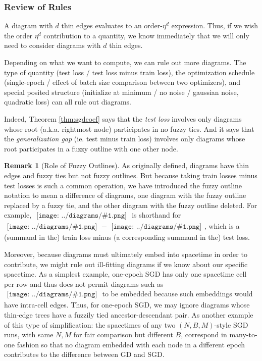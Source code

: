 \documentclass{article}
\theoremstyle{plain}
\theoremstyle{definition}
\newtheorem*{rmk*}{Remark}
\newcommand{\sdia}[1]{\begin{gathered}\texttt{[image: ../diagrams/\#1.png]}\end{gathered}}
\begin{document}
        \subsubsection*{Review of Rules}
            A diagram with $d$ thin edges evaluates to an order-$\eta^d$
            expression.  Thus, if we wish the order $\eta^d$ contribution to a
            quantity, we know immediately that we will only need to consider
            diagrams with $d$ thin edges.

            Depending on what we want to compute, we can rule out more
            diagrams.  The type of quantity (test loss / test loss minus train
            loss), the
            optimization schedule (single-epoch / effect of batch size comparison
            between two optimizers), and special posited
            structure (initialize at minimum / no noise / gaussian noise,
            quadratic loss) can all rule out diagrams.

            Indeed, Theorem \ref{thm:sgdcoef} says that the \emph{test loss}
            involves only diagrams whose root (a.k.a. rightmost node)
            participates in no fuzzy ties.  And it says that the
            \emph{generalization gap} (ie. test minus train loss) involves only
            diagrams whose root participates in a fuzzy outline with one other
            node.
            \begin{rmk*}[Role of Fuzzy Outlines]
                As originally defined, diagrams have thin edges and fuzzy ties
                but not fuzzy outlines.  But because taking train losses minus
                test losses is such a common operation, we have introduced the
                fuzzy outline notation to mean a difference of diagrams, one
                diagram with the fuzzy outline replaced by a fuzzy tie, and the
                other diagram with the fuzzy outline deleted.  For example,
                $\sdia{c(0-12)(01-12)}$ is shorthand for $\sdia{(0-12)(01-12)}
                - \sdia{(0-1-2)(01-12)}$, which is a (summand in the) train
                loss minus (a corresponding summand in the) test loss.    
            \end{rmk*}

            Moreover, because diagrams must ultimately embed into spacetime in
            order to contribute, we might rule out ill-fitting diagrams if
            we know about our specific spacetime.  As a simplest example, 
            one-epoch SGD has only one spacetime cell per row and thus does
            not permit diagrams such as $\sdia{(01-2)(01-12)}$ to be embedded
            because such embeddings would have intra-cell edges.  Thus, for
            one-epoch SGD, we may ignore diagrams whose thin-edge trees have
            a fuzzily tied ancestor-descendant pair.
            As another example of this type of simplification: the spacetimes
            of any two $(N,B,M)$-style SGD runs, with same $N, M$ for fair
            comparison but different $B$, correspond in many-to-one fashion so
            that no diagram embedded with each node in a different epoch
            contributes to the difference between GD and SGD.
\end{document}
